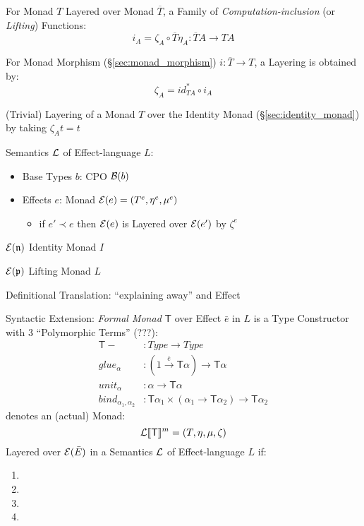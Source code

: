 For Monad $T$ Layered over Monad $\overline{T}$, a Family of
\emph{Computation-inclusion} (or \emph{Lifting}) Functions:
\[
  i_A = \zeta_A \circ \overline{T} \eta_A :
    \overline{T} A \rightarrow T A
\]

For Monad Morphism (\S\ref{sec:monad_morphism}) $i : \overline{T}
\rightarrow T$, a Layering is obtained by:
\[
  \zeta_A = id^*_{T A} \circ i_A
\]

(Trivial) Layering of a Monad $T$ over the Identity Monad
(\S\ref{sec:identity_monad}) by taking $\zeta_A t = t$

Semantics $\mathcal{L}$ of Effect-language $L$:
\begin{itemize}
  \item Base Types $b$: CPO $\mathcal{B}(b)$
  \item Effects $e$: Monad $\mathcal{E}(e) = (T^e,\eta^e,\mu^e)$
    \begin{itemize}
      \item if $e' \prec e$ then $\mathcal{E}(e)$ is Layered over
        $\mathcal{E}(e')$ by $\zeta^e$
    \end{itemize}
\end{itemize}

$\mathcal{E}(\mathfrak{n})$ Identity Monad $I$

$\mathcal{E}(\mathfrak{p})$ Lifting Monad $L$

Definitional Translation: ``explaining away'' and Effect

Syntactic Extension: \emph{Formal Monad} $\mathsf{T}$ over Effect
$\bar{e}$ in $L$ is a Type Constructor with 3 ``Polymorphic Terms''
(???):
\begin{align*}
  \mathsf{T} - &: Type \rightarrow Type \\
  glue_\alpha &: (1 \xrightarrow{\bar{e}} \mathsf{T} \alpha)
    \rightarrow \mathsf{T} \alpha \\
  unit_\alpha &: \alpha \rightarrow \mathsf{T} \alpha \\
  bind_{\alpha_1,\alpha_2} &: \mathsf{T} \alpha_1 \times (\alpha_1
    \rightarrow \mathsf{T} \alpha_2) \rightarrow \mathsf{T} \alpha_2
\end{align*}
denotes an (actual) Monad:
\[
  \mathcal{L}\llbracket \mathsf{T} \rrbracket^m = (T,\eta,\mu,\zeta)
\]
Layered over $\mathcal{E}(\bar{E})$ in a Semantics $\mathcal{L}$ of
Effect-language $L$ if: %
\begin{enumerate}
  \item
  \item
  \item
  \item
\end{enumerate}

